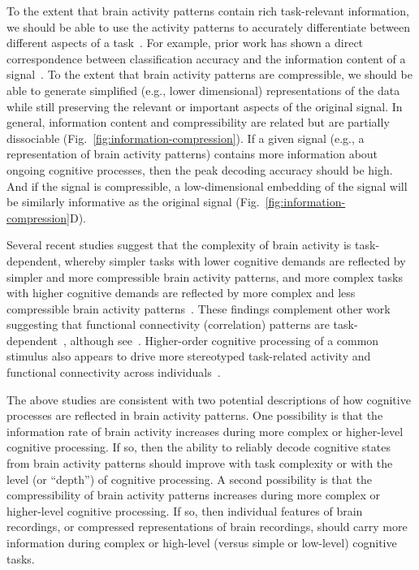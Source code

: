 \documentclass[english, 11pt]{article}
\begin{document}
To the extent that brain activity patterns contain rich task-relevant
information, we should be able to use the activity patterns to accurately
differentiate between different aspects of a task~\citep[e.g., using pattern
classifiers;][]{NormEtal06b}. For example, prior work has shown a direct
correspondence between classification accuracy and the information content of a
signal~\citep{Alva02}. To the extent that brain activity patterns are
compressible, we should be able to generate simplified (e.g., lower
dimensional) representations of the data while still preserving the relevant or
important aspects of the original signal. In general, information content and
compressibility are related but are partially dissociable
(Fig.~\ref{fig:information-compression}). If a given signal (e.g., a
representation of brain activity patterns) contains more information about
ongoing cognitive processes, then the peak decoding accuracy should be high.
And if the signal is compressible, a low-dimensional embedding of the signal
will be similarly informative as the original signal
(Fig.~\ref{fig:information-compression}D).


Several recent studies suggest that the complexity of brain activity is
task-dependent, whereby simpler tasks with lower cognitive demands are
reflected by simpler and more compressible brain activity patterns, and more
complex tasks with higher cognitive demands are reflected by more complex and
less compressible brain activity patterns~\citep{MackEtal20, OwenEtal21}. These
findings complement other work suggesting that functional connectivity
(correlation) patterns are task-dependent~\citep{FinnEtal17, OwenEtal20,
ColeEtal14}, although see~\cite{GratEtal18}. Higher-order cognitive processing
of a common stimulus also appears to drive more stereotyped task-related
activity and functional connectivity across individuals~\citep{HassEtal08,
LernEtal11, SimoChan20, SimoEtal16}.

The above studies are consistent with two potential descriptions of how
cognitive processes are reflected in brain activity patterns. One possibility
is that the information rate of brain activity increases during more complex or
higher-level cognitive processing. If so, then the ability to reliably decode
cognitive states from brain activity patterns should improve with task
complexity or with the level (or ``depth'') of cognitive processing. A second
possibility is that the compressibility of brain activity patterns increases
during more complex or higher-level cognitive processing. If so, then
individual features of brain recordings, or compressed representations of brain
recordings, should carry more information during complex or high-level (versus
simple or low-level) cognitive tasks.
\end{document}
